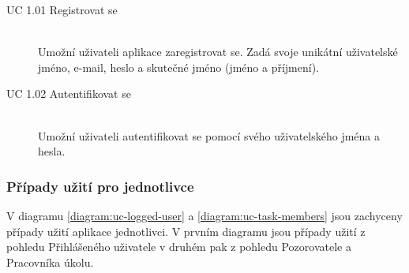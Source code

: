 \documentclass[thesis=B,czech]{FITthesis}[2012/06/26]
\begin{document}
			\begin{description}
				\item[UC 1.01 Registrovat se] \hfill \\
					Umožní uživateli aplikace zaregistrovat se. Zadá svoje unikátní uživatelské jméno, e-mail, heslo a skutečné jméno (jméno a příjmení).
					
				\item[UC 1.02 Autentifikovat se] \hfill \\
					Umožní uživateli autentifikovat se pomocí svého uživatelského jména a hesla.
					
			\end{description}
		
		
			\subsubsection{Případy užití pro jednotlivce}	
			V diagramu \ref{diagram:uc-logged-user} a \ref{diagram:uc-task-members} jsou zachyceny případy užití aplikace jednotlivci. V prvním diagramu jsou případy užití z pohledu Přihlášeného uživatele v druhém pak z pohledu Pozorovatele a Pracovníka úkolu.
			
			
			
\end{document}
